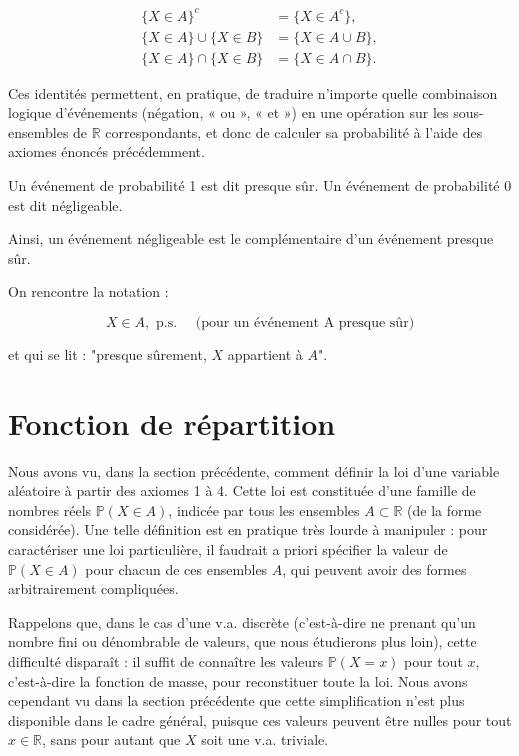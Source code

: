 \begin{align*}
\{X \in A\}^c &= \{X \in A^c\}, \\
\{X \in A\} \cup \{X \in B\} &= \{X \in A \cup B\}, \\
\{X \in A\} \cap \{X \in B\} &= \{X \in A \cap B\}.
\end{align*}

Ces identités permettent, en pratique, de traduire n'importe quelle combinaison logique d'événements (négation, « ou », « et ») en une opération sur les sous-ensembles de $\mathbb{R}$ correspondants, et donc de calculer sa probabilité à l'aide des axiomes énoncés précédemment.

\medskip

\begin{mdframed}
\begin{definition}
Un événement de probabilité 1 est dit presque sûr. Un événement de probabilité 0 est dit négligeable.

Ainsi, un événement négligeable est le complémentaire d'un événement presque sûr.
\end{definition}
\end{mdframed}

\begin{remarque}
On rencontre la notation :

$$
X \in A, \text{ p.s.} \quad \text{ (pour un événement A presque sûr)}
$$

et qui se lit : "presque sûrement, $X$ appartient à $A$".
\end{remarque}

\section{Fonction de répartition}

Nous avons vu, dans la section précédente, comment définir la loi d'une variable aléatoire à partir des axiomes 1 à 4. Cette loi est constituée d'une famille de nombres réels $\mathbb{P}(X \in A)$, indicée par tous les ensembles $A \subset \mathbb{R}$ (de la forme considérée). Une telle définition est en pratique très lourde à manipuler : pour caractériser une loi particulière, il faudrait a priori spécifier la valeur de $\mathbb{P}(X \in A)$ pour chacun de ces ensembles $A$, qui peuvent avoir des formes arbitrairement compliquées.

Rappelons que, dans le cas d'une v.a. discrète (c'est-à-dire ne prenant qu'un nombre fini ou dénombrable de valeurs, que nous étudierons plus loin), cette difficulté disparaît : il suffit de connaître les valeurs $\mathbb{P}(X = x)$ pour tout $x$, c'est-à-dire la fonction de masse, pour reconstituer toute la loi. Nous avons cependant vu dans la section précédente que cette simplification n'est plus disponible dans le cadre général, puisque ces valeurs peuvent être nulles pour tout $x \in \mathbb{R}$, sans pour autant que $X$ soit une v.a. triviale.

